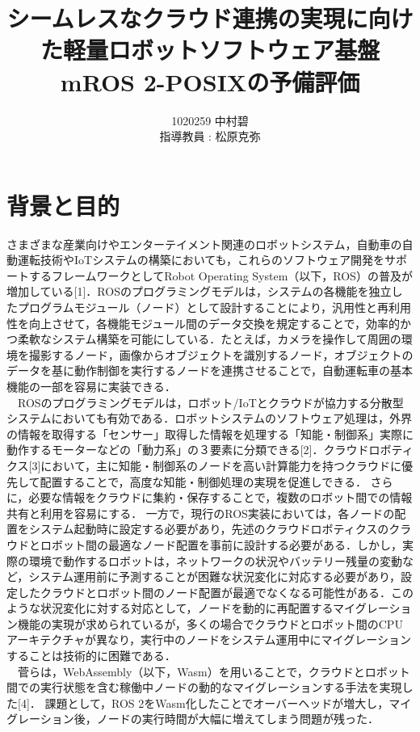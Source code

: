 \documentclass[11pt]{ujarticle}
\author{%
1020259 中村碧\\指導教員 : 松原克弥
}
\title{シームレスなクラウド連携の実現に向けた軽量ロボットソフトウェア基盤mROS 2-POSIXの予備評価}
\begin{document}
\maketitle

\section{背景と目的}
\label{sec:introduction}
さまざまな産業向けやエンターテイメント関連のロボットシステム，自動車の自動運転技術やIoTシステムの構築においても，これらのソフトウェア開発をサポートするフレームワークとしてRobot Operating System（以下，ROS）の普及が増加している[1]．ROSのプログラミングモデルは，システムの各機能を独立したプログラムモジュール（ノード）として設計することにより，汎用性と再利用性を向上させて，各機能モジュール間のデータ交換を規定することで，効率的かつ柔軟なシステム構築を可能にしている．たとえば，カメラを操作して周囲の環境を撮影するノード，画像からオブジェクトを識別するノード，オブジェクトのデータを基に動作制御を実行するノードを連携させることで，自動運転車の基本機能の一部を容易に実装できる．
\\　ROSのプログラミングモデルは，ロボット/IoTとクラウドが協力する分散型システムにおいても有効である．ロボットシステムのソフトウェア処理は，外界の情報を取得する「センサー」取得した情報を処理する「知能・制御系」実際に動作するモーターなどの「動力系」の３要素に分類できる[2]．クラウドロボティクス[3]において，主に知能・制御系のノードを高い計算能力を持つクラウドに優先して配置することで，高度な知能・制御処理の実現を促進しできる．
さらに，必要な情報をクラウドに集約・保存することで，複数のロボット間での情報共有と利用を容易にする．
一方で，現行のROS実装においては，各ノードの配置をシステム起動時に設定する必要があり，先述のクラウドロボティクスのクラウドとロボット間の最適なノード配置を事前に設計する必要がある．しかし，実際の環境で動作するロボットは，ネットワークの状況やバッテリー残量の変動など，システム運用前に予測することが困難な状況変化に対応する必要があり，設定したクラウドとロボット間のノード配置が最適でなくなる可能性がある．このような状況変化に対する対応として，ノードを動的に再配置するマイグレーション機能の実現が求められているが，多くの場合でクラウドとロボット間のCPUアーキテクチャが異なり，実行中のノードをシステム運用中にマイグレーションすることは技術的に困難である．
\\　菅らは，WebAssembly（以下，Wasm）を用いることで，クラウドとロボット間での実行状態を含む稼働中ノードの動的なマイグレーションする手法を実現した[4]．
課題として，ROS 2をWasm化したことでオーバーヘッドが増大し，マイグレーション後，ノードの実行時間が大幅に増えてしまう問題が残った．
\end{document}
